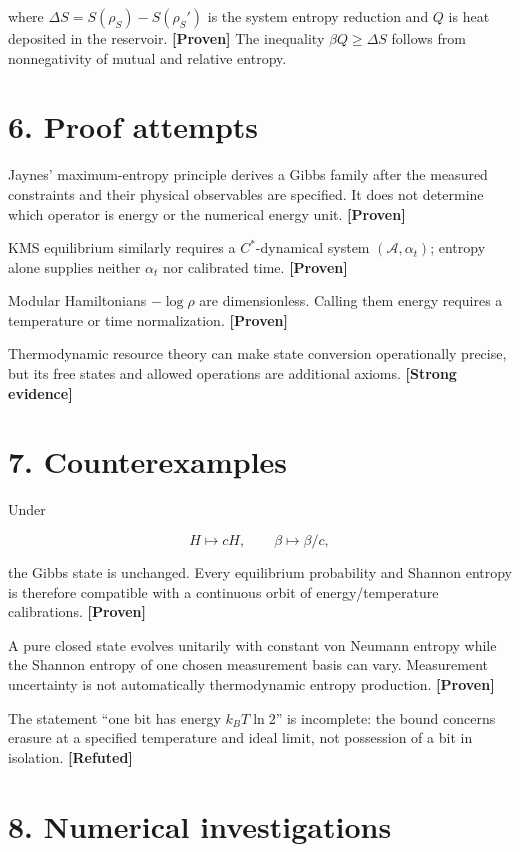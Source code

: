 \documentclass[11pt,a4paper,openany]{report}
\newcommand{\statusProven}{\textcolor{fingreen}{[Proven]}}
\newcommand{\statusStrong}{\textcolor{finblue}{[Strong evidence]}}
\newcommand{\statusRefuted}{\textcolor{finred}{[Refuted]}}
\begin{document}
where \(\Delta S=S(\rho_S)-S(\rho_S')\) is the system entropy reduction and \(Q\) is heat deposited in the reservoir. \textbf{\statusProven{}} The inequality \(\beta Q\ge\Delta S\) follows from nonnegativity of mutual and relative entropy.

\section{6. Proof attempts}

Jaynes' maximum-entropy principle derives a Gibbs family after the measured constraints and their physical observables are specified. It does not determine which operator is energy or the numerical energy unit. \textbf{\statusProven{}}

KMS equilibrium similarly requires a \(C^*\)-dynamical system \((\mathcal A,\alpha_t)\); entropy alone supplies neither \(\alpha_t\) nor calibrated time. \textbf{\statusProven{}}

Modular Hamiltonians \(-\log\rho\) are dimensionless. Calling them energy requires a temperature or time normalization. \textbf{\statusProven{}}

Thermodynamic resource theory can make state conversion operationally precise, but its free states and allowed operations are additional axioms. \textbf{\statusStrong{}}

\section{7. Counterexamples}

Under

\[
H\mapsto cH,\qquad \beta\mapsto\beta/c,
\]

the Gibbs state is unchanged. Every equilibrium probability and Shannon entropy is therefore compatible with a continuous orbit of energy/\allowbreak{}temperature calibrations. \textbf{\statusProven{}}

A pure closed state evolves unitarily with constant von Neumann entropy while the Shannon entropy of one chosen measurement basis can vary. Measurement uncertainty is not automatically thermodynamic entropy production. \textbf{\statusProven{}}

The statement “one bit has energy \(k_BT\ln2\)” is incomplete: the bound concerns erasure at a specified temperature and ideal limit, not possession of a bit in isolation. \textbf{\statusRefuted{}}

\section{8. Numerical investigations}
\end{document}
